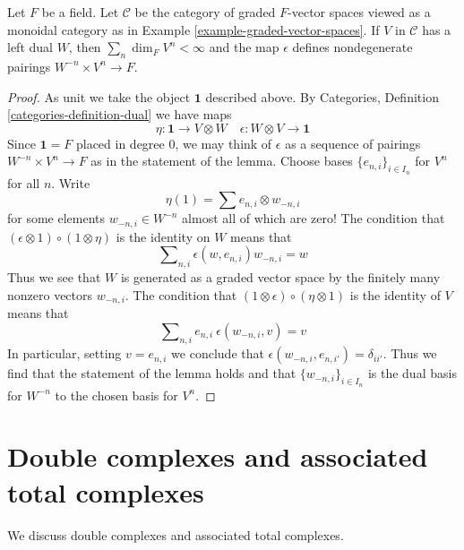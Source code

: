 \begin{lemma}
\label{lemma-left-dual-graded-vector-spaces}
Let $F$ be a field. Let $\mathcal{C}$ be the category of graded
$F$-vector spaces viewed as a monoidal category as in
Example \ref{example-graded-vector-spaces}. If $V$ in $\mathcal{C}$
has a left dual $W$, then $\sum_n \dim_F V^n < \infty$
and the map $\epsilon$ defines nondegenerate pairings
$W^{-n} \times V^n \to F$.
\end{lemma}

\begin{proof}
As unit we take the object $\mathbf{1}$ described above.
By Categories, Definition \ref{categories-definition-dual} we have
maps
$$
\eta : \mathbf{1} \to V \otimes W\quad
\epsilon : W \otimes V \to \mathbf{1}
$$
Since $\mathbf{1} = F$ placed in degree $0$, we
may think of $\epsilon$ as a sequence of pairings
$W^{-n} \times V^n \to F$ as in the statement of the lemma.
Choose bases $\{e_{n, i}\}_{i \in I_n}$ for $V^n$ for all $n$.
Write
$$
\eta(1) = \sum e_{n, i} \otimes w_{-n, i}
$$
for some elements $w_{-n, i} \in W^{-n}$ almost all of which are zero!
The condition that $(\epsilon \otimes 1) \circ (1 \otimes \eta)$ is the
identity on $W$ means that
$$
\sum\nolimits_{n, i} \epsilon(w, e_{n, i})w_{-n, i} = w
$$
Thus we see that $W$ is generated as a graded vector space
by the finitely many nonzero vectors $w_{-n, i}$.
The condition that $(1 \otimes \epsilon) \circ (\eta \otimes 1)$
is the identity of $V$ means that
$$
\sum\nolimits_{n, i} e_{n, i}\ \epsilon(w_{-n, i}, v) = v
$$
In particular, setting $v = e_{n, i}$ we conclude that
$\epsilon(w_{-n, i}, e_{n, i'}) = \delta_{ii'}$. Thus
we find that the statement of the lemma holds and that
$\{w_{-n, i}\}_{i \in I_n}$ is the dual basis for $W^{-n}$ to
the chosen basis for $V^n$.
\end{proof}






\section{Double complexes and associated total complexes}
\label{section-double-complexes}

\noindent
We discuss double complexes and associated total complexes.

